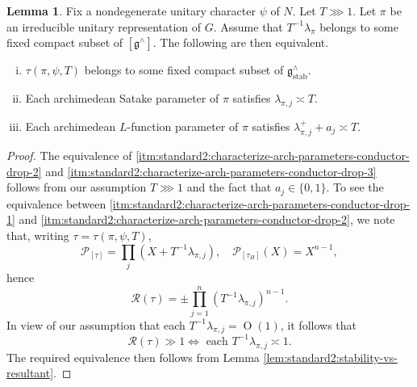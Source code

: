 \documentclass[reqno]{amsart}
\DeclareMathOperator{\stab}{stab}
\def\O{\operatorname{O}}
\theoremstyle{plain} \newtheorem{theorem} {Theorem}
\theoremstyle{definition} \newtheorem{definition} [theorem] {Definition}
\theoremstyle{itplain} %
\newtheorem{lemma}[theorem]{Lemma}
\numberwithin{equation}{section}
\numberwithin{theorem}{section}
\begin{document}
\begin{lemma}\label{lem:standard2:no-conductor-drop-vs-tau}
  Fix a nondegenerate unitary character $\psi$ of $N$.  Let $T \ggg 1$.  Let $\pi$ be an irreducible unitary representation of $G$.  Assume that $T^{-1} \lambda_\pi$ belongs to some fixed compact subset of $[\mathfrak{g}^\wedge]$.  The following are then equivalent.
  \begin{enumerate}[(i)]
  \item
    \label{itm:standard2:characterize-arch-parameters-conductor-drop-1} $\tau(\pi,\psi,T)$ belongs to some fixed compact subset of $\mathfrak{g}^\wedge_{\stab}$.
  \item \label{itm:standard2:characterize-arch-parameters-conductor-drop-2} Each archimedean Satake parameter of $\pi$ satisfies $\lambda_{\pi,j} \asymp T$.
  \item \label{itm:standard2:characterize-arch-parameters-conductor-drop-3} Each archimedean $L$-function parameter of $\pi$ satisfies $\lambda_{\pi,j}^+ + a_j \asymp T$.
  \end{enumerate}  
\end{lemma}
\begin{proof}
  The equivalence of \eqref{itm:standard2:characterize-arch-parameters-conductor-drop-2} and \eqref{itm:standard2:characterize-arch-parameters-conductor-drop-3} follows from our assumption $T \ggg 1$ and the fact that $a_j \in \{0,1\}$.  To see the equivalence between \eqref{itm:standard2:characterize-arch-parameters-conductor-drop-1} and \eqref{itm:standard2:characterize-arch-parameters-conductor-drop-2}, we note that, writing $\tau = \tau(\pi,\psi,T)$,
  \begin{equation*}
    \mathcal{P}_{[\tau]} = \prod_j (X + T^{-1} \lambda_{\pi,j}),
    \quad 
    \mathcal{P}_{[\tau_H]}(X) = X^{n-1},
  \end{equation*}
  hence
  \begin{equation*}
    \mathcal{R}(\tau) = \pm \prod_{j=1}^n (T^{-1} \lambda_{\pi,j})^{n-1}.
  \end{equation*}
  In view of our assumption that each $T^{-1} \lambda_{\pi, j} = \O(1)$, it follows that
  \begin{equation*}
    \mathcal{R}(\tau) \gg 1 \iff \text{ each } T^{-1} \lambda_{\pi,j} \asymp 1.
  \end{equation*}
  The required equivalence then follows from Lemma \ref{lem:standard2:stability-vs-resultant}.
\end{proof}
\end{document}
